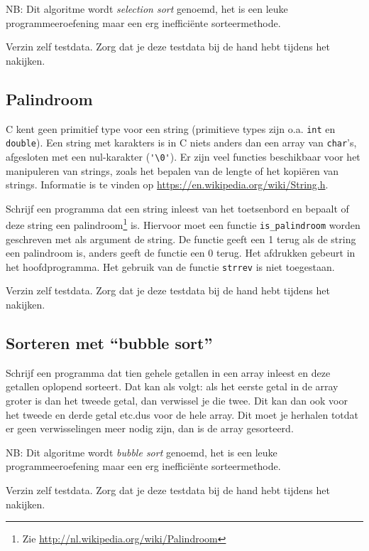 \documentclass[a4paper,10pt,fleqn,twoside]{article}
\begin{document}
NB: Dit algoritme wordt \textsl{selection sort} genoemd, het is een leuke programmeeroefening maar een erg inefficiënte sorteermethode.

Verzin zelf testdata. Zorg dat je deze testdata bij de hand hebt tijdens het nakijken.

\subsection{Palindroom}
C kent geen primitief type voor een string (primitieve types zijn o.a. \lstinline|int| en \lstinline|double|). Een string met karakters is in C niets anders dan een array van \lstinline|char|’s, afgesloten met een nul-karakter (\lstinline|'\0'|). Er zijn veel functies beschikbaar voor het manipuleren van strings, zoals het bepalen van de lengte of het kopiëren van strings. Informatie is te vinden op \url{https://en.wikipedia.org/wiki/String.h}.

Schrijf een programma dat een string inleest van het toetsenbord en bepaalt of deze string een palindroom\footnote{Zie \url{http://nl.wikipedia.org/wiki/Palindroom}} is. Hiervoor moet een functie \lstinline|is_palindroom| worden geschreven met als argument de string. De functie geeft een 1 terug als de string een palindroom is, anders geeft de functie een 0 terug. Het afdrukken gebeurt in het hoofdprogramma. Het gebruik van de functie \lstinline|strrev| is niet toegestaan.

Verzin zelf testdata. Zorg dat je deze testdata bij de hand hebt tijdens het nakijken.

\subsection{Sorteren met ``bubble sort''}
Schrijf een programma dat tien gehele getallen in een array inleest en deze getallen oplopend sorteert. Dat kan als volgt: als het eerste getal in de array groter is dan het tweede getal, dan verwissel je die twee. Dit kan dan ook voor het tweede en derde getal etc.\@ dus voor de hele array. Dit moet je herhalen totdat er geen verwisselingen meer nodig zijn, dan is de array gesorteerd.

NB: Dit algoritme wordt \textsl{bubble sort} genoemd, het is een leuke programmeeroefening maar een erg inefficiënte sorteermethode.

Verzin zelf testdata. Zorg dat je deze testdata bij de hand hebt tijdens het nakijken.
\end{document}
